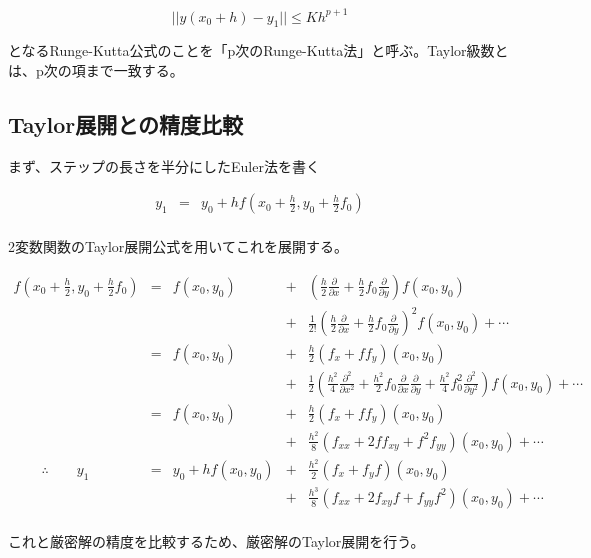 \[
|| y(x_0+h) - y_1 || \leq Kh^{p+1}
\]

となるRunge-Kutta公式のことを「p次のRunge-Kutta法」と呼ぶ。Taylor級数とは、p次の項まで一致する。

\subsection{Taylor展開との精度比較}
まず、ステップの長さを半分にしたEuler法を書く

\begin{eqnarray*}
y_1 & = & y_0 + hf\left( x_0 + \frac{h}{2} , y_0 + \frac{h}{2}f_0 \right) \\
\end{eqnarray*}

2変数関数のTaylor展開公式を用いてこれを展開する。

\[
\begin{array}{lclcl}
f\left( x_0 + \frac{h}{2} , y_0 + \frac{h}{2}f_0 \right) & = & f( x_0 , y_0 ) & + & \left(\frac{h}{2}\frac{\partial }{\partial x} + \frac{h}{2}f_0 \frac{\partial }{\partial y}\right) f(x_0 , y_0)\\
 & & & + & \frac{1}{2!} \left(\frac{h}{2}\frac{\partial }{\partial x} + \frac{h}{2}f_0 \frac{\partial }{\partial y}\right)^2 f(x_0 , y_0) + \cdots\\
 & = & f(x_0,y_0) & + & \frac{h}{2}\left(f_x + f f_y\right) (x_0 , y_0)\\
 & & & + & \frac{1}{2} \left(\frac{h^2}{4}\frac{\partial^2 }{\partial x^2} + \frac{h^2}{2} f_0 \frac{\partial }{\partial x}\frac{\partial }{\partial y} + \frac{h^2}{4}f_0^2\frac{\partial^2 }{\partial y^2}\right) f(x_0 , y_0) + \cdots\\
 & = & f(x_0 , y_0) & + & \frac{h}{2}\left(f_x + f f_y\right) (x_0 , y_0)\\
 & & & + & \frac{h^2}{8} \left(f_{xx} + 2 f f_{xy} + f^2 f_{yy}\right) (x_0 , y_0) + \cdots\\
\hspace{2em}\therefore \hspace{2em}y_1 & = & y_0 + hf(x_0 , y_0) & + & \frac{h^2}{2}\left(f_x + f_y f\right) (x_0 , y_0)\\
               &  &                     & + & \frac{h^3}{8} \left(f_{xx} + 2 f_{xy} f + f_{yy} f^2\right) (x_0 , y_0) + \cdots\\
\end{array}
\]

これと厳密解の精度を比較するため、厳密解のTaylor展開を行う。

